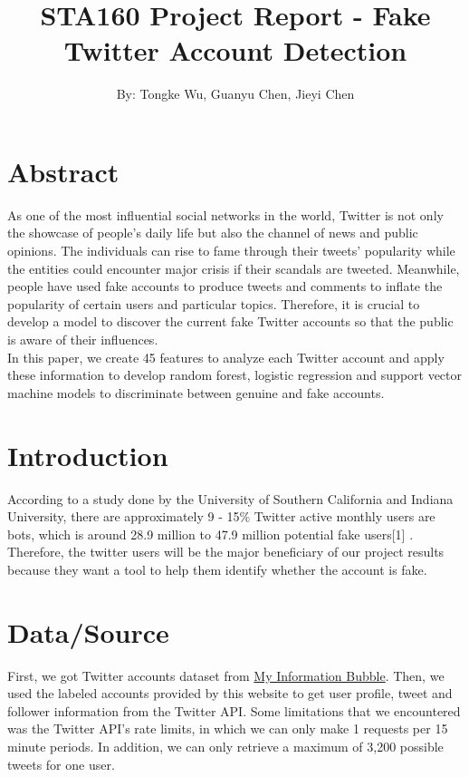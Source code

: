 \documentclass[a4paper, twoside, 12pt]{report}
\begin{document}
\title{STA160 Project Report - Fake Twitter Account Detection}
\maketitle
\author{By: Tongke Wu, Guanyu Chen, Jieyi Chen}
{}
\section{Abstract}
As one of the most influential social networks in the world, Twitter is not only the showcase of people's daily life but also the channel of news and public opinions. The individuals can rise to fame through their tweets' popularity while the entities could encounter major crisis if their scandals are tweeted. Meanwhile, people have used fake accounts to produce tweets and comments to inflate the popularity of certain users and particular topics. Therefore, it is crucial to develop a model to discover the current fake Twitter accounts so that the public is aware of their influences.\\

\noindent In this paper, we create 45 features to analyze each Twitter account and apply these information to develop random forest, logistic regression and support vector machine models to discriminate between genuine and fake accounts.

\section{Introduction}
According to a study done by the University of Southern California and Indiana University, there are approximately 9 - 15\% Twitter active monthly users are bots, which is around 28.9 million to 47.9 million potential fake users[1] . Therefore, the twitter users will be the major beneficiary of our project results because they want a tool to help them identify whether the account is fake. 

\section{Data/Source}
First, we got Twitter accounts dataset from \href{http://mib.projects.iit.cnr.it/dataset.html}{My Information Bubble}. Then, we used the labeled accounts provided by this website to get user profile, tweet and follower information from the Twitter API. Some limitations that we encountered was the Twitter API's rate limits, in which we can only make 1 requests per 15 minute periods. In addition, we can only retrieve a maximum of 3,200 possible tweets for one user.\\
\end{document}
